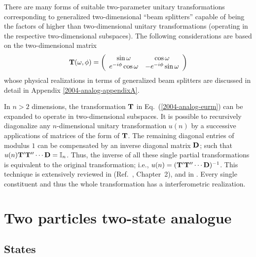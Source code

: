 \documentclass[12pt]{iopart}
\begin{document}
There are many forms of suitable two-parameter unitary transformations
corresponding to generalized two-dimensional ``beam splitters''
capable of being the factors of higher than two-dimensional unitary transformations
(operating in the respective two-dimensional subspaces).
The following considerations are based on the two-dimensional matrix
\begin{equation}
{\bf T}(\omega ,\phi )=
\left(
\begin{array}{cc}
\sin \omega &\cos  \omega \\
e^{-i \phi }\cos  \omega & -e^{-i \phi }\sin \omega
\end{array}
\right)
\label{2004-analog-eurm}
\end{equation}
whose physical realizations in terms of generalized beam splitters
are discussed in detail in Appendix \ref{2004-analog-appendixA}.

In $n>2$ dimensions,
the transformation ${\bf T}$ in Eq.~(\ref{2004-analog-eurm}) can be expanded to operate
in two-dimensional subspaces.
It is possible to recursively diagonalize any $n$-dimensional unitary transformation
$u(n)$ by
a successive applications of matrices of the form of ${\bf T}$.
The remaining diagonal entries of modulus $1$
can be compensated by an inverse diagonal matrix ${\bf D}$; such that
$u(n){\bf T}'{\bf T}'' \cdots {\bf D} ={\Bbb I}_n$.
Thus,
the inverse of all these single partial transformations is equivalent to the original transformation;
i.e., $u(n)=({\bf T}'{\bf T}'' \cdots {\bf D})^{-1}$.
This technique is extensively reviewed in (Ref.~\cite{murnaghan}, Chapter~2),
and in \cite{rzbb,reck-94}.
Every single constituent and thus the whole transformation has a
interferometric realization.


\section{Two particles two-state analogue}


\subsection{States}
\end{document}
